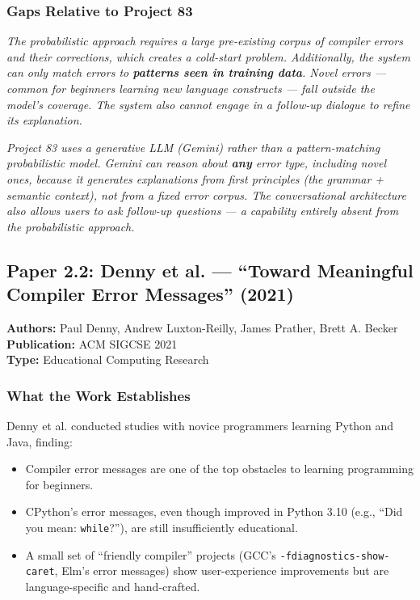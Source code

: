 \documentclass[a4paper,11pt]{article}
\newcommand{\papergap}[1]{%
  \begin{tcolorbox}[colback=red!5!white, colframe=red!60!black, title={Research Gap Identified}]
  \textit{#1}
  \end{tcolorbox}
}
\newcommand{\oursolution}[1]{%
  \begin{tcolorbox}[colback=green!5!white, colframe=green!60!black, title={How Project 83 Solves This Gap}]
  \textit{#1}
  \end{tcolorbox}
}
\begin{document}
\subsubsection{Gaps Relative to Project 83}

\papergap{The probabilistic approach requires a large pre-existing corpus of compiler errors and their corrections, which creates a cold-start problem. Additionally, the system can only match errors to \textbf{patterns seen in training data}. Novel errors --- common for beginners learning new language constructs --- fall outside the model's coverage. The system also cannot engage in a follow-up dialogue to refine its explanation.}

\oursolution{Project 83 uses a generative LLM (Gemini) rather than a pattern-matching probabilistic model. Gemini can reason about \textbf{any} error type, including novel ones, because it generates explanations from first principles (the grammar + semantic context), not from a fixed error corpus. The conversational architecture also allows users to ask follow-up questions --- a capability entirely absent from the probabilistic approach.}

\subsection{Paper 2.2: Denny et al. --- ``Toward Meaningful Compiler Error Messages'' (2021)}

\begin{tcolorbox}[colback=gray!5, colframe=gray!40]
\textbf{Authors:} Paul Denny, Andrew Luxton-Reilly, James Prather, Brett A. Becker \\
\textbf{Publication:} ACM SIGCSE 2021 \\
\textbf{Type:} Educational Computing Research
\end{tcolorbox}

\subsubsection{What the Work Establishes}

Denny et al. conducted studies with novice programmers learning Python and Java, finding:
\begin{itemize}
    \item Compiler error messages are one of the top obstacles to learning programming for beginners.
    \item CPython's error messages, even though improved in Python 3.10 (e.g., ``Did you mean: \texttt{while}?''), are still insufficiently educational.
    \item A small set of ``friendly compiler'' projects (GCC's \texttt{-fdiagnostics-show-caret}, Elm's error messages) show user-experience improvements but are language-specific and hand-crafted.
\end{itemize}
\end{document}
